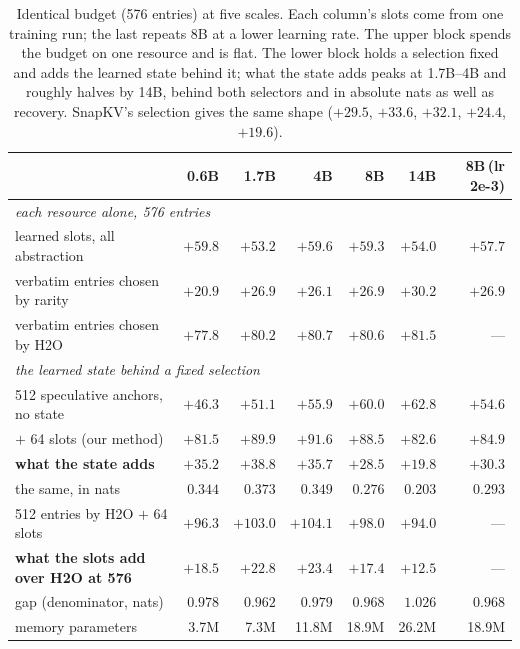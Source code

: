 \documentclass[11pt]{article}
\begin{document}
\begin{table}[ht]
\centering
\small
\begin{tabular}{lrrrrrr}
\toprule
 & 0.6B & 1.7B & 4B & 8B & 14B & 8B\,(lr 2e-3) \\
\midrule
\multicolumn{7}{l}{\emph{each resource alone, 576 entries}} \\
learned slots, all abstraction       & $+59.8$ & $+53.2$ & $+59.6$ & $+59.3$ & $+54.0$ & $+57.7$ \\
verbatim entries chosen by rarity    & $+20.9$ & $+26.9$ & $+26.1$ & $+26.9$ & $+30.2$ & $+26.9$ \\
verbatim entries chosen by H2O       & $+77.8$ & $+80.2$ & $+80.7$ & $+80.6$ & $+81.5$ & --- \\
\midrule
\multicolumn{7}{l}{\emph{the learned state behind a fixed selection}} \\
512 speculative anchors, no state    & $+46.3$ & $+51.1$ & $+55.9$ & $+60.0$ & $+62.8$ & $+54.6$ \\
\quad $+$ 64 slots (our method)      & $+81.5$ & $+89.9$ & $\mathbf{+91.6}$ & $+88.5$ & $+82.6$ & $+84.9$ \\
\quad \textbf{what the state adds}   & $+35.2$ & $\mathbf{+38.8}$ & $+35.7$ & $+28.5$ & $+19.8$ & $+30.3$ \\
\quad \quad the same, in nats        & $0.344$ & $\mathbf{0.373}$ & $0.349$ & $0.276$ & $0.203$ & $0.293$ \\
512 entries by H2O $+$ 64 slots      & $+96.3$ & $+103.0$ & $\mathbf{+104.1}$ & $+98.0$ & $+94.0$ & --- \\
\quad \textbf{what the slots add over H2O at 576} & $+18.5$ & $+22.8$ & $\mathbf{+23.4}$ & $+17.4$ & $+12.5$ & --- \\
\midrule
gap (denominator, nats)              & $0.978$ & $0.962$ & $0.979$ & $0.968$ & $1.026$ & $0.968$ \\
memory parameters                    & 3.7M & 7.3M & 11.8M & 18.9M & 26.2M & 18.9M \\
\bottomrule
\end{tabular}
\caption{Identical budget (576 entries) at five scales. Each column's slots come
from one training run; the last repeats 8B at a lower learning rate. The upper
block spends the budget on one resource and is flat. The lower block holds a
selection fixed and adds the learned state behind it; what the state adds peaks
at 1.7B--4B and roughly halves by 14B, behind both selectors and in absolute
nats as well as recovery. SnapKV's selection gives the same shape ($+29.5$,
$+33.6$, $+32.1$, $+24.4$, $+19.6$).}
\label{tab:scale}
\end{table}
\end{document}
